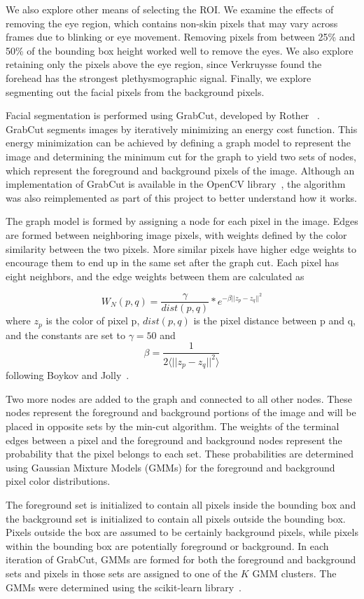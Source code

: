 \documentclass[10pt,twocolumn,letterpaper]{article}
\begin{document}
We also explore other means of selecting the ROI. We examine the effects of removing the eye region, which contains non-skin pixels that may vary across frames due to blinking or eye movement. Removing pixels from between 25\% and 50\% of the bounding box height worked well to remove the eyes. We also explore retaining only the pixels above the eye region, since Verkruysse \etal found the forehead has the strongest plethysmographic signal. Finally, we explore segmenting out the facial pixels from the background pixels.

Facial segmentation is performed using GrabCut, developed by Rother \etal~\cite{Rother:2004aa}. GrabCut segments images by iteratively minimizing an energy cost function. This energy minimization can be achieved by defining a graph model to represent the image and determining the minimum cut for the graph to yield two sets of nodes, which represent the foreground and background pixels of the image. Although an implementation of GrabCut is available in the OpenCV library~\cite{opencv_library}, the algorithm was also reimplemented as part of this project to better understand how it works.

The graph model is formed by assigning a node for each pixel in the image. Edges are formed between neighboring image pixels, with weights defined by the color similarity between the two pixels. More similar pixels have higher edge weights to encourage them to end up in the same set after the graph cut. Each pixel has eight neighbors, and the edge weights between them are calculated as

$$ W_N(p,q) = \frac{\gamma}{dist(p,q)} * e^{-\beta ||z_p-z_q||^2}$$ 
where $z_p$ is the color of pixel p, $dist(p,q)$ is the pixel distance between p and q, and the constants are set to $\gamma = 50$ and 
$$\beta = \frac{1}{2 \langle ||z_p-z_q||^2\rangle}$$
following Boykov and Jolly~\cite{Boykov:2001aa}.

Two more nodes are added to the graph and connected to all other nodes. These nodes represent the foreground and background portions of the image and will be placed in opposite sets by the min-cut algorithm. The weights of the terminal edges between a pixel and the foreground and background nodes represent the probability that the pixel belongs to each set. These probabilities are determined using Gaussian Mixture Models (GMMs) for the foreground and background pixel color distributions.

The foreground set is initialized to contain all pixels inside the bounding box and the background set is initialized to contain all pixels outside the bounding box. Pixels outside the box are assumed to be certainly background pixels, while pixels within the bounding box are potentially foreground or background. In each iteration of GrabCut, GMMs are formed for both the foreground and background sets and pixels in those sets are assigned to one of the $K$ GMM clusters. The GMMs were determined using the scikit-learn library~\cite{scikit-learn}.
\end{document}
